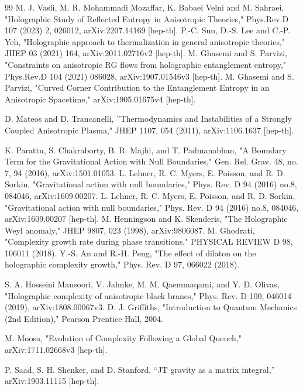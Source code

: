 \documentclass[]{article}
\begin{document}
\begin{thebibliography}{99}
M. J. Vasli, M. R. Mohammadi Mozaffar, K. Babaei Velni and M. Sahraei, "Holographic Study of Reflected Entropy in Anisotropic Theories," Phys.Rev.D 107 (2023) 2, 026012, arXiv:2207.14169 [hep-th].
P.-C. Sun, D.-S. Lee and C.-P. Yeh, "Holographic approach to thermalization in general anisotropic theories," JHEP 03 (2021) 164, arXiv:2011.02716v2 [hep-th].
M. Ghasemi and S. Parvizi, "Constraints on anisotropic RG flows from holographic entanglement entropy," Phys.Rev.D 104 (2021) 086028, arXiv:1907.01546v3 [hep-th].
M. Ghasemi and S. Parvizi, "Curved Corner Contribution to the Entanglement Entropy in an Anisotropic Spacetime,"  arXiv:1905.01675v4 [hep-th].






 D. Mateos and D. Trancanelli, ''Thermodynamics and Instabilities of a Strongly Coupled Anisotropic Plasma," JHEP 1107, 054 (2011),
arXiv:1106.1637 [hep-th].


 K. Parattu, S. Chakraborty, B. R. Majhi, and T. Padmanabhan, "A Boundary Term for the Gravitational Action with Null Boundaries," Gen. Rel. Grav. 48, no. 7, 94 (2016), arXiv:1501.01053.
L. Lehner, R. C. Myers, E. Poisson, and R. D. Sorkin, "Gravitational action with null boundaries," Phys. Rev. D 94 (2016) no.8, 084046, arXiv:1609.00207.
L. Lehner, R. C. Myers, E. Poisson, and R. D. Sorkin, "Gravitational action with null boundaries," Phys. Rev. D 94 (2016) no.8, 084046, arXiv:1609.00207 [hep-th].
 M. Henningson and K. Skenderis, "The Holographic Weyl anomaly," JHEP 9807, 023 (1998), arXiv:9806087.
M. Ghodrati, "Complexity growth rate during phase transitions," PHYSICAL REVIEW D 98, 106011 (2018).
Y.-S. An and R.-H. Peng, "The effect of dilaton on the holographic complexity growth,"  Phys. Rev. D 97, 066022 (2018).

 S. A. Hosseini Mansoori, V. Jahnke, M. M. Qaemmaqami, and Y. D. Olivas, "Holographic complexity of anisotropic black branes," Phys. Rev. D 100, 046014 (2019), arXiv:1808.00067v3.
D. J. Griffiths, "Introduction to Quantum Mechanics (2nd Edition)," Pearson Prentice Hall, 2004.


M. Moosa, "Evolution of Complexity Following a Global Quench," arXiv:1711.02668v3 [hep-th].

P. Saad, S. H. Shenker, and D. Stanford, “JT gravity as a matrix integral,”
arXiv:1903.11115 [hep-th].


\end{thebibliography}
\end{document}
